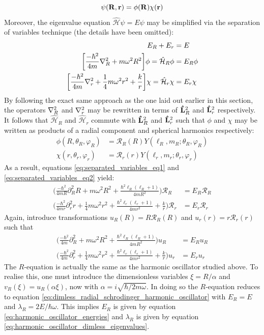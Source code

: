 \documentclass[reprint,english]{revtex4-1}
\newcommand{\Ham}{\hat{\mathcal{H}}}
\begin{document}
\begin{equation}
\psi(\vb{R},\vb{r})=\phi(\vb{R})\chi(\vb{r})
\end{equation}
Moreover, the eigenvalue equation \(\Ham\psi=E\psi\) may be simplified via the separation of variables technique (the details have been omitted):
\begin{subequations}
\begin{align}
E_R+E_r&=E\\
\bigg[\frac{-\hbar^2}{4m}\laplacian_R+m\omega^2R^2\bigg]\phi=\Ham_R\phi&=E_R\phi\label{eq:separated_variables_eq1}\\
\bigg[\frac{-\hbar^2}{4m}\laplacian_r+\frac{1}{4}m\omega^2r^2+\frac{k}{r}\bigg]\chi=\Ham_r\chi&=E_r\chi\label{eq:separated_variables_eq2}
\end{align}
\end{subequations}
By following the exact same approach as the one laid out earlier in this section, the operators \(\laplacian_R\) and \(\laplacian_r\) may be rewritten in terms of \(\vu{L}_R^2\) and \(\vu{L}_r^2\) respectively. It follows that \(\Ham_R\) and \(\Ham_r\) commute with \(\vu{L}_R^2\) and \(\vu{L}_r^2\) such that \(\phi\) and \(\chi\) may be written as products of a radial component and spherical harmonics respectively:
\begin{subequations}
\begin{align}
\phi(R,\theta_R,\varphi_R)&=\mathcal{R}_R(R)Y(\ell_R,m_R;\theta_R,\varphi_R)\\
\chi(r,\theta_r,\varphi_r)&=\mathcal{R}_r(r)Y(\ell_r,m_r;\theta_r,\varphi_r)
\end{align}
\end{subequations}
As a result, equations \eqref{eq:separated_variables_eq1} and \eqref{eq:separated_variables_eq2} yield:
\begin{align*}
\bigg(\frac{-\hbar^2}{4mR}\partial_R^2R+m\omega^2R^2+\frac{\hbar^2\ell_R(\ell_R+1)}{4mR^2}\bigg)\mathcal{R}_R&=E_R\mathcal{R}_R\\
\bigg(\frac{-\hbar^2}{4mr}\partial_r^2r+\frac{1}{4}m\omega^2r^2+\frac{\hbar^2\ell_r(\ell_r+1)}{4mr^2}+\frac{k}{r}\bigg)\mathcal{R}_r&=E_r\mathcal{R}_r
\end{align*}
Again, introduce transformations \(u_R(R)=R\mathcal{R}_R(R)\) and \(u_r(r)=r\mathcal{R}_r(r)\) such that
\begin{align*}
\bigg(\frac{-\hbar^2}{4m}\partial_R^2+m\omega^2R^2+\frac{\hbar^2\ell_R(\ell_R+1)}{4mR^2}\bigg)u_R&=E_Ru_R\\
\bigg(\frac{-\hbar^2}{4m}\partial_r^2+\frac{1}{4}m\omega^2r^2+\frac{\hbar^2\ell_r(\ell_r+1)}{4mr^2}+\frac{k}{r}\bigg)u_r&=E_ru_r
\end{align*}
The \(R\)-equation is actually the same as the harmonic oscillator studied above. To realise this, one must introduce the dimensionless variables \(\xi=R/\alpha\) and \(v_R(\xi)=u_R(\alpha\xi)\), now with \(\alpha=i\sqrt{\hbar/2m\omega}\). In doing so the \(R\)-equation reduces to equation \eqref{eq:dimless_radial_schrodinger_harmonic_oscillator} with \(E_R=E\) and \(\lambda_R=2E/\hbar\omega\). This implies \(E_R\) is given by equation \eqref{eq:harmonic_oscillator_energies} and \(\lambda_R\) is given by equation \eqref{eq:harmonic_oscillator_dimless_eigenvalues}.
\end{document}
